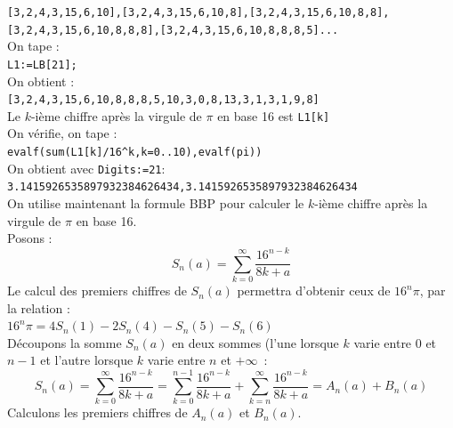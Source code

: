 \documentclass[a4paper,11pt]{book}
\begin{document}
{\tt [3,2,4,3,15,6,10],[3,2,4,3,15,6,10,8],[3,2,4,3,15,6,10,8,8],}\\
{\tt [3,2,4,3,15,6,10,8,8,8],[3,2,4,3,15,6,10,8,8,8,5]...}\\
On tape :\\
{\tt L1:=LB[21];}\\
On obtient :\\
{\tt [3,2,4,3,15,6,10,8,8,8,5,10,3,0,8,13,3,1,3,1,9,8]}\\
Le $k$-i\`eme chiffre apr\`es la virgule de $\pi$ en base 16 est {\tt L1[k]}\\
On v\'erifie, on tape :\\
{\tt evalf(sum(L1[k]/16\verb|^|k,k=0..10),evalf(pi))}\\
On obtient avec {\tt Digits:=21}:\\
{\tt 3.1415926535897932384626434,3.1415926535897932384626434}\\
On utilise maintenant la formule BBP pour calculer le $k$-i\`eme chiffre apr\`es
la virgule de $\pi$ en base 16.\\
Posons :
$$S_n(a)=\sum_{k=0}^\infty \frac{16^{n-k}}{8k+a}$$
Le calcul des premiers chiffres de $S_n(a)$ permettra d'obtenir ceux de
$16^n\pi$, par la relation :\\
$16^{n}\pi = 4 S_n(1)-2 S_n(4)-S_n(5)-S_n(6)$\\
D\'ecoupons la somme $S_n(a)$ en deux sommes (l'une lorsque $k$ varie entre 0
et $n-1$ et l'autre lorsque $k$ varie entre $n$ et $+\infty$~:
$$S_n(a)=\sum_{k=0}^\infty \frac{16^{n-k}}{8k+a}=\sum_{k=0}^{n-1} \frac{16^{n-k}}{8k+a}+\sum_{k=n}^ \infty \frac{16^{n-k}}{8k+a} = A_n(a) + B_n(a)$$
Calculons les premiers chiffres de $A_n(a)$ et $B_n(a)$.
\end{document}
